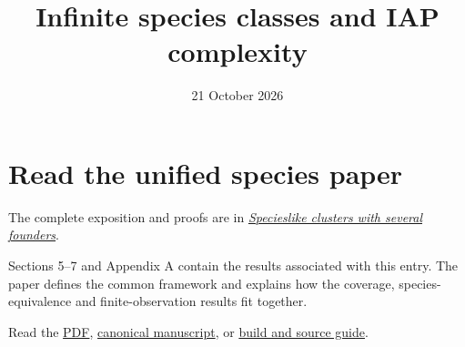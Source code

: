 \documentclass[
  11pt,
  letterpaper,
]{article}
\title{Infinite species classes and IAP complexity}
\author{}
\date{21 October 2026}
\begin{document}
\maketitle

\section{Read the unified species
paper}\label{read-the-unified-species-paper}

The complete exposition and proofs are in
\href{../06-founding-cohort-species/founding-cohort-species.pdf}{\emph{Specieslike
clusters with several founders}}.

Sections 5--7 and Appendix A contain the results associated with this
entry. The paper defines the common framework and explains how the
coverage, species-equivalence and finite-observation results fit
together.

Read the
\href{../06-founding-cohort-species/founding-cohort-species.pdf}{PDF},
\href{../06-founding-cohort-species/founding-cohort-species.md}{canonical
manuscript}, or \href{../06-founding-cohort-species/README.md}{build and
source guide}.
\end{document}

